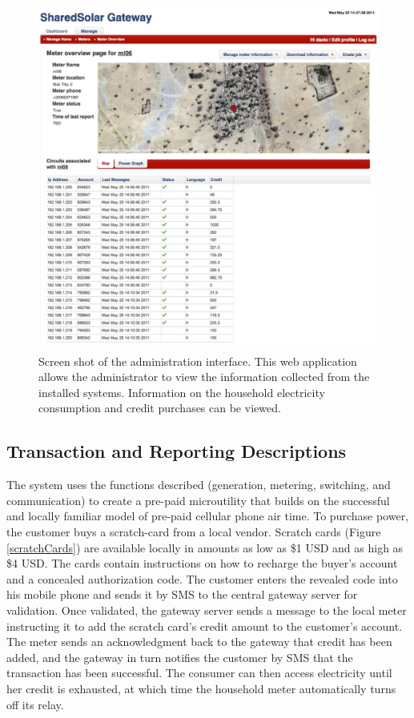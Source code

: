 \documentclass{sig-alternate}
\begin{document}
\begin{figure}[]
\begin{center}
\includegraphics[width=\columnwidth]{figures/gateway.jpg}
\end{center}
\caption{Screen shot of the administration interface.  This web application allows
the administrator to view the information collected from the installed systems.  Information
on the household electricity consumption and credit purchases can be viewed.  }
\label{gateway}
\end{figure}

\subsection{Transaction and Reporting Descriptions}
The system uses the functions described (generation, metering,
switching, and communication) to create a pre-paid microutility that
builds on the successful and locally familiar model of pre-paid cellular
phone air time.
To purchase power, the customer buys a scratch-card from a local vendor.
Scratch cards (Figure \ref{scratchCards}) are available locally in
amounts as low as \$1 USD  and as high as \$4 USD.
The cards contain instructions on how to recharge the buyer's account
and a concealed authorization code.
The customer enters the revealed code into his mobile phone and sends it by
SMS to the central gateway server for validation.
Once validated, the gateway server sends a message to the local meter
instructing it to add the scratch card's credit amount to the
customer's account.
The meter sends an acknowledgment back to the gateway that credit has
been added, and the gateway in turn notifies the customer by SMS that
the transaction has been successful.
The consumer can then access electricity until her credit is exhausted,
at which time the household meter automatically turns off its relay.
\end{document}
